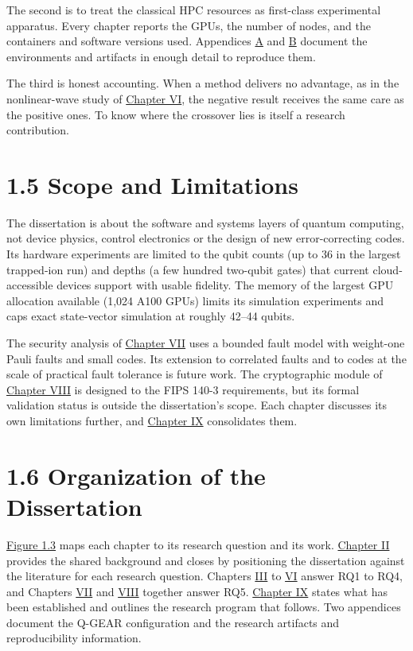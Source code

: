 \documentclass{report}
\theoremstyle{plain}
\theoremstyle{definition}
\theoremstyle{remark}
\begin{document}
The second is to treat the classical HPC resources as first-class experimental apparatus. Every chapter reports the GPUs, the number of nodes, and the containers and software versions used. Appendices \hyperref[app:qgear]{A} and \hyperref[app:repro]{B} document the environments and artifacts in enough detail to reproduce them.

The third is honest accounting. When a method delivers no advantage, as in the nonlinear-wave study of \hyperref[ch:synthesis]{Chapter VI}, the negative result receives the same care as the positive ones. To know where the crossover lies is itself a research contribution.

\section{1.5 Scope and Limitations}\label{sec:intro:scope}

The dissertation is about the software and systems layers of quantum computing, not device physics, control electronics or the design of new error-correcting codes. Its hardware experiments are limited to the qubit counts (up to 36 in the largest trapped-ion run) and depths (a few hundred two-qubit gates) that current cloud-accessible devices support with usable fidelity. The memory of the largest GPU allocation available (1,024 A100 GPUs) limits its simulation experiments and caps exact state-vector simulation at roughly 42--44 qubits.

The security analysis of \hyperref[ch:qec]{Chapter VII} uses a bounded fault model with weight-one Pauli faults and small codes. Its extension to correlated faults and to codes at the scale of practical fault tolerance is future work. The cryptographic module of \hyperref[ch:pqc]{Chapter VIII} is designed to the FIPS 140-3 requirements, but its formal validation status is outside the dissertation's scope. Each chapter discusses its own limitations further, and \hyperref[ch:conclusion]{Chapter IX} consolidates them.

\section{1.6 Organization of the Dissertation}\label{sec:intro:organization}

\hyperref[fig:intro:roadmap]{Figure 1.3} maps each chapter to its research question and its work. \hyperref[ch:background]{Chapter II} provides the shared background and closes by positioning the dissertation against the literature for each research question. Chapters \hyperref[ch:qgear]{III} to \hyperref[ch:synthesis]{VI} answer RQ1 to RQ4, and Chapters \hyperref[ch:qec]{VII} and \hyperref[ch:pqc]{VIII} together answer RQ5. \hyperref[ch:conclusion]{Chapter IX} states what has been established and outlines the research program that follows. Two appendices document the Q-GEAR configuration and the research artifacts and reproducibility information.
\end{document}
